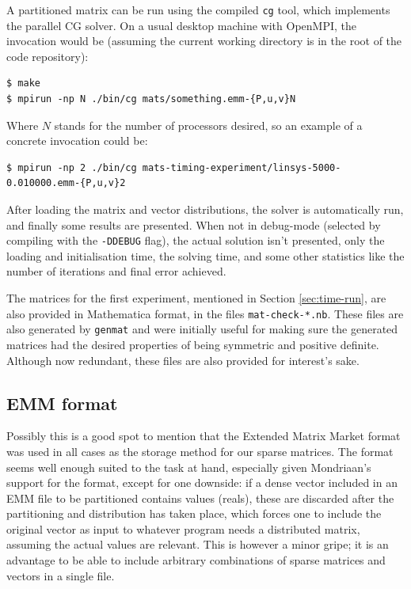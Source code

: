 \documentclass[a4paper]{article}
\begin{document}
A partitioned matrix can be run using the compiled \texttt{cg} tool, which implements the parallel CG solver. On
a usual desktop machine with OpenMPI, the invocation would be (assuming the current working directory is in
the root of the code repository):

\begin{verbatim}
$ make
$ mpirun -np N ./bin/cg mats/something.emm-{P,u,v}N
\end{verbatim}

Where $N$ stands for the number of processors desired, so an example of a concrete invocation could be:
\begin{verbatim}
$ mpirun -np 2 ./bin/cg mats-timing-experiment/linsys-5000-0.010000.emm-{P,u,v}2
\end{verbatim}

After loading the matrix and vector distributions, the solver is automatically
run, and finally some results are presented. When not in debug-mode (selected by compiling
with the \texttt{-DDEBUG} flag), the actual solution isn't presented, only the loading and
initialisation time, the solving time, and some other statistics like the number of iterations
and final error achieved.

The matrices for the first experiment, mentioned in Section \ref{sec:time-run}, are also provided
in Mathematica format, in the files \texttt{mat-check-*.nb}. These files are also generated by \texttt{genmat} and
were initially useful for making sure the generated matrices had the desired properties of being
symmetric and positive definite. Although now redundant, these files are also provided for interest's sake.

\subsection{EMM format}

Possibly this is a good spot to mention that the Extended Matrix Market format was
used in all cases as the storage method for our sparse matrices. The format seems well
enough suited to the task at hand, especially given Mondriaan's support for the format,
except for one downside: if a dense vector included in an EMM file to be partitioned
contains values (reals), these are discarded after the partitioning and distribution has taken
place, which forces one to include the original vector as input to whatever program needs a
distributed matrix, assuming the actual values are relevant. This is however a minor gripe;
it is an advantage to be able to include arbitrary combinations of sparse matrices and vectors
in a single file.
\end{document}
